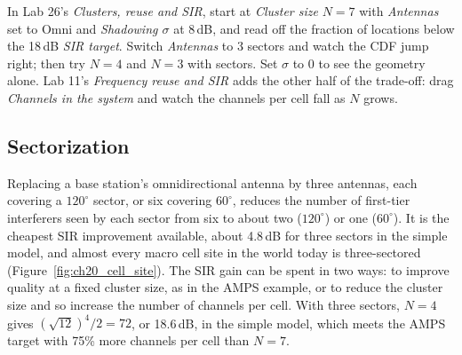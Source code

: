 
\begin{tryit}
In Lab 26's \emph{Clusters, reuse and SIR}, start at \emph{Cluster size} $N=7$ with \emph{Antennas} set to
Omni and \emph{Shadowing $\sigma$} at 8\,dB, and read off the fraction of locations below the 18\,dB
\emph{SIR target}. Switch \emph{Antennas} to 3 sectors and watch the CDF jump right; then try $N=4$ and
$N=3$ with sectors. Set $\sigma$ to 0 to see the geometry alone. Lab 11's \emph{Frequency reuse and SIR}
adds the other half of the trade-off: drag \emph{Channels in the system} and watch the channels per cell
fall as $N$ grows.
\end{tryit}

\subsection{Sectorization}

Replacing a base station's omnidirectional antenna by three antennas, each covering a $120^\circ$ sector, or six
covering $60^\circ$, reduces the number of first-tier interferers seen by each sector from six to about two
($120^\circ$) or one ($60^\circ$). It is the cheapest SIR improvement available, about 4.8\,dB for three sectors in
the simple model, and almost every macro cell site in the world today is three-sectored
(Figure~\ref{fig:ch20_cell_site}). The SIR gain can be spent in two ways: to improve quality at a fixed cluster
size, as in the AMPS example, or to reduce the cluster size and so increase the number of channels per cell. With
three sectors, $N=4$ gives $(\sqrt{12})^4/2=72$, or 18.6\,dB, in the simple model, which meets the AMPS target
with 75\% more channels per cell than $N=7$.


